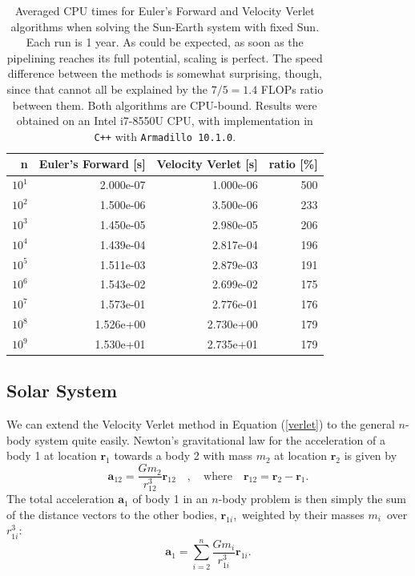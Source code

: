 \documentclass[]{article}
\begin{document}
\begin{table}[!ht]
	\caption{Averaged CPU times for Euler's Forward and Velocity Verlet algorithms when solving the Sun-Earth system with fixed Sun. Each run is 1 year. As could be expected, as soon as the pipelining reaches its full potential, scaling is perfect. The speed difference between the methods is somewhat surprising, though, since that cannot all be explained by the $7/5=1.4$ FLOPs ratio between them. Both algorithms are CPU-bound. Results were obtained on an Intel i7-8550U CPU, with implementation  in \lstinline|C++| with \lstinline|Armadillo 10.1.0|.}
	\label{tab:cpu-time}
	\begin{center}
		\begin{tabular}{rrrr}
			\toprule
			n &     Euler's Forward [s] &    Velocity Verlet [s] & ratio [\%] \\
			\midrule
			$10^1$ & 2.000e-07 & 1.000e-06 & 500 \\
			$10^2$ & 1.500e-06 & 3.500e-06 & 233 \\
			$10^3$ & 1.450e-05 & 2.980e-05 & 206 \\
			$10^4$ & 1.439e-04 & 2.817e-04 & 196 \\
			$10^5$ & 1.511e-03 & 2.879e-03 & 191 \\
			$10^6$ & 1.543e-02 & 2.699e-02 & 175 \\
			$10^7$ & 1.573e-01 & 2.776e-01 & 176 \\
			$10^8$ & 1.526e+00 & 2.730e+00 & 179 \\
			$10^9$ & 1.530e+01 & 2.735e+01 & 179 \\
			\bottomrule
		\end{tabular}
	\end{center}
\end{table}

\subsection{Solar System} \label{solar-system}
We can extend the Velocity Verlet method in Equation (\ref{verlet}) to the general $n$-body system quite easily. Newton's gravitational law for the acceleration of a body 1 at location $\mathbf{r}_1$ towards a body 2 with mass $m_2$ at location $\mathbf{r}_2$ is given by 
\begin{equation}
	\mathbf{a}_{12} = \frac{Gm_2}{r_{12}^3} \mathbf{r}_{12} \quad , \quad \text{where} \quad \mathbf{r}_{12} = \mathbf{r}_{2} - \mathbf{r}_{1}.
\end{equation}
The total acceleration $\mathbf{a}_{1}$ of body 1 in an $n$-body problem is then simply the sum of the distance vectors to the other bodies, $\mathbf{r}_{1i}$, weighted by their masses $m_i$ over $r_{1i}^3$:
\begin{equation}
	\mathbf{a}_{1} = \sum_{i=2}^{n} \frac{Gm_i}{r_{1i}^3} \mathbf{r}_{1i}.
\end{equation}
\end{document}
